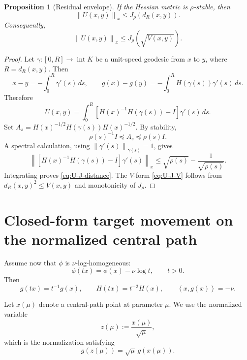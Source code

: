 \documentclass[11pt]{article}
\newtheorem{proposition}[theorem]{Proposition}
\newcommand{\ip}[2]{\left\langle #1,#2\right\rangle}
\newcommand{\norm}[1]{\left\|#1\right\|}
\newcommand{\distR}{d_R}
\begin{document}
\begin{proposition}[Residual envelope]
If the Hessian metric is $\rho$-stable, then
\begin{equation}
  \norm{U(x,y)}_x\le J_\rho(\distR(x,y)).               \label{eq:U-J-distance}
\end{equation}
Consequently,
\begin{equation}
  \norm{U(x,y)}_x\le J_\rho(\sqrt{V(x,y)}).             \label{eq:U-J-V}
\end{equation}
\end{proposition}

\begin{proof}
Let $\gamma:[0,R]\to\operatorname{int}K$ be a unit-speed geodesic from $x$ to $y$, where $R=\distR(x,y)$. Then
\[
  x-y=-\int_0^R \gamma'(s)\,ds,
  \qquad
  g(x)-g(y)=-\int_0^R H(\gamma(s))\gamma'(s)\,ds.
\]
Therefore
\[
  U(x,y)=\int_0^R\left[H(x)^{-1}H(\gamma(s))-I\right]\gamma'(s)\,ds.
\]
Set $A_s=H(x)^{-1/2}H(\gamma(s))H(x)^{-1/2}$.  By stability,
\[
  \rho(s)^{-1}I\preceq A_s\preceq \rho(s)I.
\]
A spectral calculation, using $\norm{\gamma'(s)}_{\gamma(s)}=1$, gives
\[
  \left\|\left[H(x)^{-1}H(\gamma(s))-I\right]\gamma'(s)\right\|_x
  \le
  \sqrt{\rho(s)}-\frac{1}{\sqrt{\rho(s)}}.
\]
Integrating proves \eqref{eq:U-J-distance}.  The $V$-form \eqref{eq:U-J-V} follows from $\distR(x,y)^2\le V(x,y)$ and monotonicity of $J_\rho$.
\end{proof}

\section{Closed-form target movement on the normalized central path}

Assume now that $\phi$ is $\nu$-log-homogeneous:
\begin{equation}
  \phi(tx)=\phi(x)-\nu\log t,
  \qquad t>0.
\end{equation}
Then
\begin{equation}
  g(tx)=t^{-1}g(x),
  \qquad
  H(tx)=t^{-2}H(x),
  \qquad
  \ip{x}{g(x)}=-\nu.                    \label{eq:lh-identities}
\end{equation}

Let $x(\mu)$ denote a central-path point at parameter $\mu$.  We use the normalized variable
\begin{equation}
  z(\mu):=\frac{x(\mu)}{\sqrt{\mu}},                 \label{eq:z-normalization}
\end{equation}
which is the normalization satisfying
\begin{equation}
  g(z(\mu))=\sqrt{\mu}\,g(x(\mu)).
\end{equation}
\end{document}

